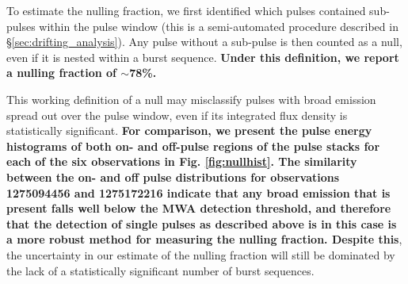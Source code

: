 \documentclass[linenumbers]{aastex631}
\newcommand{\nullfraction}{78\%}
\begin{document}
To estimate the nulling fraction, we first identified which pulses contained sub-pulses within the pulse window (this is a semi-automated procedure described in \S\ref{sec:drifting_analysis}).
Any pulse without a sub-pulse is then counted as a null, even if it is nested within a burst sequence.
{\bf Under this definition, we report a nulling fraction of $\sim$\nullfraction{}.}

This working definition of a null may misclassify pulses with broad emission spread out over the pulse window, even if its integrated flux density is statistically significant.
{\bf For comparison, we present the pulse energy histograms of both on- and off-pulse regions of the pulse stacks for each of the six observations in Fig. \ref{fig:nullhist}.
The similarity between the on- and off pulse distributions for observations 1275094456 and 1275172216 indicate that any broad emission that is present falls well below the MWA detection threshold, and therefore that the detection of single pulses as described above is in this case is a more robust method for measuring the nulling fraction.
Despite this}, the uncertainty in our estimate of the nulling fraction will still be dominated by the lack of a statistically significant number of burst sequences.
\end{document}
